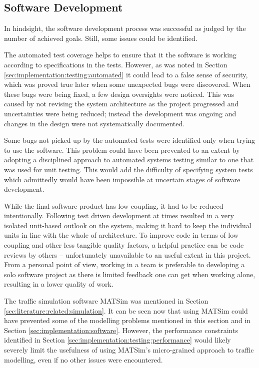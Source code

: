 \subsection{Software Development}

In hindsight, the software development process was successful as judged by the
number of achieved goals. Still, some issues could be identified.

The automated test coverage helps to ensure that it the software is working
according to specifications in the tests. However, as was noted in Section
\ref{sec:implementation:testing:automated} it could lead to a false sense of
security, which was proved true later when some unexpected bugs were
discovered. When these bugs were being fixed, a few design oversights were
noticed. This was caused by not revising the system architecture as the project
progressed and uncertainties were being reduced; instead the development was
ongoing and changes in the design were not systematically documented.

Some bugs not picked up by the automated tests were identified only when trying
to use the software. This problem could have been prevented to an extent by
adopting a disciplined approach to automated systems testing similar to one
that was used for unit testing. This would add the difficulty of specifying
system tests which admittedly would have been impossible at uncertain stages of
software development.

While the final software product has low coupling, it had to be reduced
intentionally. Following test driven development at times resulted in a very
isolated unit-based outlook on the system, making it hard to keep the
individual units in line with the whole of architecture. To improve code in
terms of low coupling and other less tangible quality factors, a helpful
practice can be code reviews by others -- unfortunately unavailable to an
useful extent in this project. From a personal point of view, working in a team
is preferable to developing a solo software project as there is limited
feedback one can get when working alone, resulting in a lower quality of work.

The traffic simulation software MATSim was mentioned in Section
\ref{sec:literature:related:simulation}. It can be seen now that using MATSim
could have prevented some of the modelling problems mentioned in this section
and in Section \ref{sec:implementation:software}. However, the performance
constraints identified in Section \ref{sec:implementation:testing:performance}
would likely severely limit the usefulness of using MATSim's micro-grained
approach to traffic modelling, even if no other issues were encountered.


